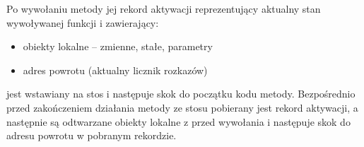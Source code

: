 \documentclass[../algorytmy.tex]{subfiles}
\begin{document}

    Po wywołaniu metody jej rekord aktywacji reprezentujący aktualny stan
    wywoływanej funkcji i zawierający:
    \begin{itemize}
        \item obiekty lokalne – zmienne, stałe, parametry
        \item adres powrotu (aktualny licznik rozkazów)
    \end{itemize}
    jest wstawiany na stos i następuje skok do początku kodu metody.
    Bezpośrednio przed zakończeniem działania metody ze stosu pobierany jest
    rekord aktywacji, a następnie są odtwarzane obiekty lokalne z przed
    wywołania i następuje skok do adresu powrotu w pobranym rekordzie.

    \pagebreak
\end{document}
